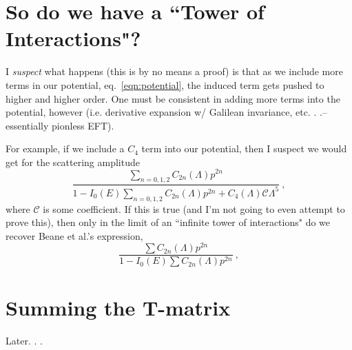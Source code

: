 \documentclass[11pt]{article}
\begin{document}
\section{So do we have a ``Tower of Interactions"?}
I \emph{suspect} what happens (this is by no means a proof) is that as we include more terms in our potential, eq.~\eqref{eqn:potential}, the induced term gets pushed to higher and higher order.  One must be consistent in adding more terms into the potential, however (i.e. derivative expansion w/ Galilean invariance, etc. . .--essentially pionless EFT).  

For example, if we include a $C_4$ term into our potential, then I suspect we would get for the scattering amplitude
 \begin{equation}
 \frac{\sum_{n=0,1,2}C_{2n}(\Lambda)p^{2n}}{1-I_0(E)\sum_{n=0,1,2}C_{2n}(\Lambda)p^{2n}+C_4(\Lambda) \mathcal{C}\Lambda^5}\ ,
 \end{equation}
 where $\mathcal{C}$ is some coefficient.  If this is true (and I'm not going to even attempt to prove this), then only in the limit of an ``infinite tower of interactions" do we recover Beane et al.'s expression,
\begin{equation}
\frac{\sum C_{2 n}(\Lambda) p^{2 n}}{1-I_{0}(E) \sum C_{2 n}(\Lambda) p^{2 n}}\ ,
\end{equation}

\section{Summing the T-matrix}
Later. . .



%
\end{document}
